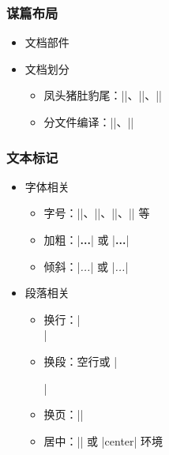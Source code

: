 \begin{frame}[fragile]
  \frametitle{谋篇布局}
  \begin{itemize}
    \item 文档部件
    \item 文档划分
          \begin{itemize}
            \item 凤头猪肚豹尾：|\frontmatter|、|\mainmatter|、|\backmatter|
            \item 分文件编译：||、||
          \end{itemize}
  \end{itemize}
\end{frame}

\begin{frame}[fragile]
  \frametitle{文本标记}
  \begin{itemize}
    \item 字体相关
          \begin{itemize}
            \item 字号：|\tiny|、|\small|、|\large|、|\Large| 等
            \item 加粗：|{\bfseries ...}| 或 |\textbf{...}|
            \item 倾斜：|{\itshape ...}| 或 |\textit{...}|
          \end{itemize}
    \item 段落相关
          \begin{itemize}
            \item 换行：|\\|
            \item 换段：空行或 |\par|
            \item 换页：|\newpage|
            \item 居中：|\centering| 或 |center| 环境
          \end{itemize}
  \end{itemize}
\end{frame}

